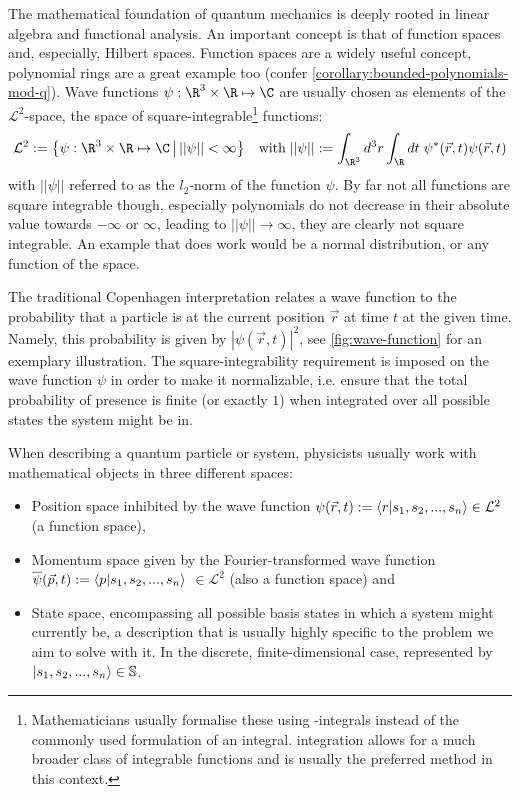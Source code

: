 The mathematical foundation of quantum mechanics is deeply rooted in linear algebra and functional analysis.
An important concept is that of function spaces and, especially, Hilbert spaces.
Function spaces are a widely useful concept, polynomial rings are a great example too (confer \cref{corollary:bounded-polynomials-mod-q}).
Wave functions $\psi: \R^3 \times \R \mapsto \C$ are usually chosen as elements of the $\mathcal{L}^2$-space, the space of square-integrable\footnote{Mathematicians usually formalise these using -integrals instead of the commonly used  formulation of an integral.  integration allows for a much broader class of integrable functions and is usually the preferred method in this context.} functions:
$$\mathcal{L}^2 := \big\{\psi: \R^3 \times \R \mapsto \C \,\big|\, ||\psi|| < \infty\big\} \quad \text{with} \; ||\psi|| := \int_{\R^3} d^3 r \int_{\R} dt \; \psi^*(\vec{r}, t) \psi(\vec{r}, t)$$
with $||\psi||$ referred to as the $l_2$-norm of the function $\psi$.
By far not all functions are square integrable though, especially polynomials do not decrease in their absolute value towards $-\infty$ or $\infty$, leading to $||\psi|| \rightarrow \infty$, they are clearly not square integrable.
An example that does work would be a normal distribution, or any function of the  space.

The traditional Copenhagen interpretation relates a wave function to the probability that a particle is at the current position $\vec{r}$ at time $t$ at the given time.
Namely, this probability is given by $|\psi(\vec{r}, t)|^2$, see \cref{fig:wave-function} for an exemplary illustration.
The square-integrability requirement is imposed on the wave function $\psi$ in order to make it normalizable, i.e. ensure that the total probability of presence is finite (or exactly $1$) when integrated over all possible states the system might be in.

When describing a quantum particle or system, physicists usually work with mathematical objects in three different spaces:
\begin{itemize}
  \item Position space inhibited by the wave function $\psi(\vec{r}, t) := \braket{r | s_1, s_2, ..., s_n} \in \mathcal{L}^2$ (a function space),
  \item Momentum space given by the Fourier-transformed wave function $\overline{\psi}(\vec{p}, t) := \braket{p | s_1, s_2, ..., s_n}$ $\in \mathcal{L}^2$ (also a function space) and
  \item State space, encompassing all possible basis states in which a system might currently be, a description that is usually highly specific to the problem we aim to solve with it.
        In the discrete, finite-dimensional case, represented by $\ket{s_1, s_2, ..., s_n} \in \mathbb{S}$.
\end{itemize}

